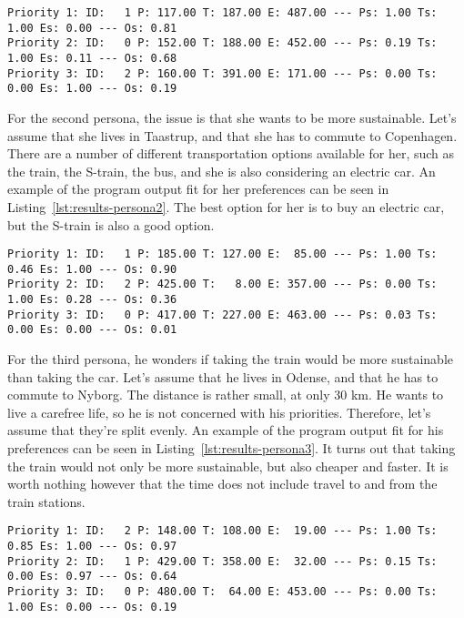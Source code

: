 \begin{lstlisting}[label={lst:results-persona1}, caption={Output for Asger Johansen.}, captionpos=b, language={}]
Priority 1: ID:   1 P: 117.00 T: 187.00 E: 487.00 --- Ps: 1.00 Ts: 1.00 Es: 0.00 --- Os: 0.81
Priority 2: ID:   0 P: 152.00 T: 188.00 E: 452.00 --- Ps: 0.19 Ts: 1.00 Es: 0.11 --- Os: 0.68
Priority 3: ID:   2 P: 160.00 T: 391.00 E: 171.00 --- Ps: 0.00 Ts: 0.00 Es: 1.00 --- Os: 0.19
\end{lstlisting}

For the second persona, the issue is that she wants to be more sustainable.
Let's assume that she lives in Taastrup, and that she has to commute to Copenhagen.
There are a number of different transportation options available for her, such as the train, the S-train, the bus, and
she is also considering an electric car.
An example of the program output fit for her preferences can be seen in Listing~\ref{lst:results-persona2}.
The best option for her is to buy an electric car, but the S-train is also a good option.

\begin{lstlisting}[label={lst:results-persona2}, caption={Output for Josefine Madsen.}, captionpos=b, language={}]
Priority 1: ID:   1 P: 185.00 T: 127.00 E:  85.00 --- Ps: 1.00 Ts: 0.46 Es: 1.00 --- Os: 0.90
Priority 2: ID:   2 P: 425.00 T:   8.00 E: 357.00 --- Ps: 0.00 Ts: 1.00 Es: 0.28 --- Os: 0.36
Priority 3: ID:   0 P: 417.00 T: 227.00 E: 463.00 --- Ps: 0.03 Ts: 0.00 Es: 0.00 --- Os: 0.01
\end{lstlisting}

For the third persona, he wonders if taking the train would be more sustainable than taking the car.
Let's assume that he lives in Odense, and that he has to commute to Nyborg.
The distance is rather small, at only 30 km.
He wants to live a carefree life, so he is not concerned with his priorities.
Therefore, let's assume that they're split evenly.
An example of the program output fit for his preferences can be seen in Listing~\ref{lst:results-persona3}.
It turns out that taking the train would not only be more sustainable, but also cheaper and faster.
It is worth nothing however that the time does not include travel to and from the train stations.

\begin{lstlisting}[label={lst:results-persona3}, caption={Output for Martin Jensen.}, captionpos=b, language={}]
Priority 1: ID:   2 P: 148.00 T: 108.00 E:  19.00 --- Ps: 1.00 Ts: 0.85 Es: 1.00 --- Os: 0.97
Priority 2: ID:   1 P: 429.00 T: 358.00 E:  32.00 --- Ps: 0.15 Ts: 0.00 Es: 0.97 --- Os: 0.64
Priority 3: ID:   0 P: 480.00 T:  64.00 E: 453.00 --- Ps: 0.00 Ts: 1.00 Es: 0.00 --- Os: 0.19
\end{lstlisting}

